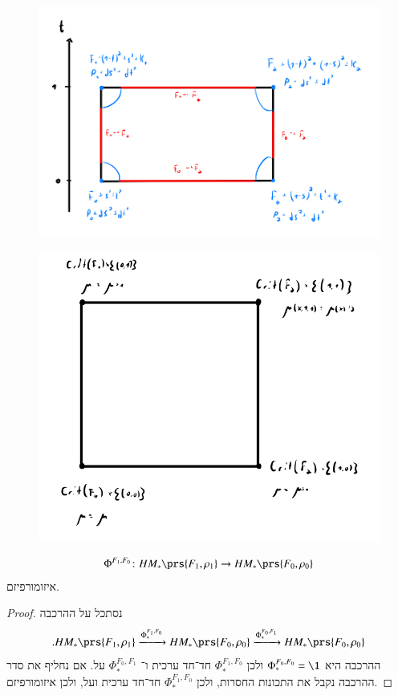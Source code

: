 \documentclass[a4paper,10pt,twoside,openany]{book}
\begin{document}
\begin{figure}
\centering
\includegraphics[scale=0.5]{sources/7.3.a}
\caption{}
\label{7.3.a}
\end{figure}

\begin{figure}
\centering
\includegraphics[scale=0.5]{sources/7.3.b}
\caption{}
\label{7.3.b}
\end{figure}

\begin{corollary}
\[\Phi^{F_1, F_0} \colon HM_*\prs{F_1, \rho_1} \to HM_*\prs{F_0, \rho_0}\]
איזומורפיזם.
\end{corollary}

\begin{proof}
נסתכל על ההרכבה
\[\text{.} HM_*\prs{F_1, \rho_1} \xrightarrow{\Phi_*^{F_1, F_0}} HM_*\prs{F_0, \rho_0} \xrightarrow{\Phi_*^{F_0, F_1}} HM_*\prs{F_0, \rho_0}\]
ההרכבה היא
$\Phi_*^{F_0, F_0} = \1$
ולכן
$\Phi_*^{F_1, F_0}$
חד־חד ערכית ו־%
$\Phi_*^{F_0, F_1}$
על.
אם נחליף את סדר ההרכבה נקבל את התכונות החסרות, ולכן
$\Phi_*^{F_1, F_0}$
חד־חד ערכית ועל, ולכן איזומורפיזם.
\end{proof}
\end{document}
